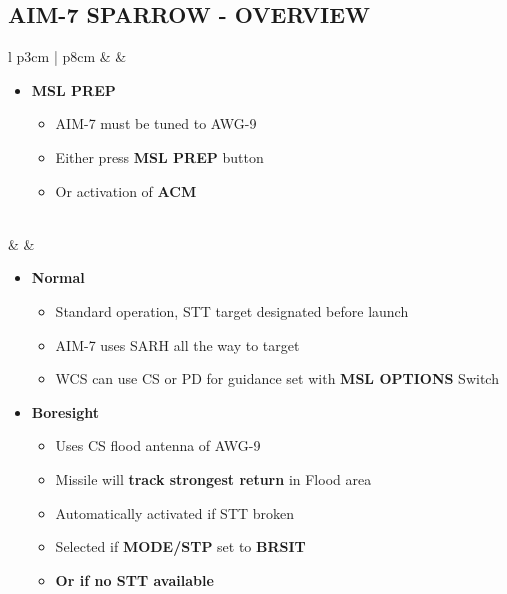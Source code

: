 \documentclass[8pt,usenames,dvipsnames,twoside]{article}
\begin{document}
		\subsection{AIM-7 SPARROW - OVERVIEW}
		\begin{center}
			\begin{longtable}{l p{3cm} | p{8cm}}
				\toprule
				\textbullet &  \hfill \null {} \thumbnar & 
				\begin{minipage}[t]{\linewidth}
					\vspace{-7pt}
					\begin{itemize}
						\item \textbf{MSL PREP}
						\begin{itemize}
							\item AIM-7 must be tuned to AWG-9
							\item Either press \textbf{MSL PREP} button
							\item Or activation of \textbf{ACM}
						\end{itemize} 
					\end{itemize} 
				\end{minipage} \\
				\midrule
				\textbullet &  & 
				\begin{minipage}[t]{\linewidth}
					\vspace{-7pt}
					\begin{itemize}
						\item \textbf{Normal} 
						\begin{itemize}
							\item Standard operation, STT target designated before launch
							\item AIM-7 uses SARH all the way to target
							\item WCS can use CS or PD for guidance set with \textbf{MSL OPTIONS} Switch
						\end{itemize}
						\item \textbf{Boresight}
						\begin{itemize}
							\item Uses CS flood antenna of AWG-9
							\item Missile will \textbf{track strongest return} in Flood area
							\item Automatically activated if STT broken
							\item Selected if \textbf{MODE/STP} set to \textbf{BRSIT}
							\item \textbf{Or if no STT available}

\end{itemize}
\end{itemize}
\end{minipage}
\end{longtable}
\end{center}
\end{document}
